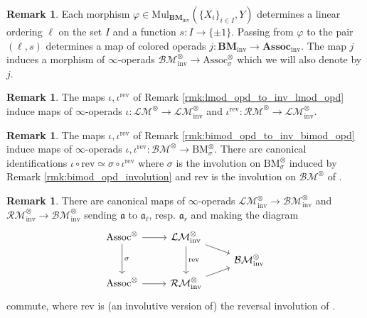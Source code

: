 \documentclass{article}
\renewcommand{\phi}{\varphi}
\newcommand{\Associnv}{\mathrm{Assoc}_\sigma}
\newcommand{\BMinv}{\mathrm{BM}_\sigma} %
\theoremstyle{definition}
\newtheorem{remark}[equation]{Remark}
\begin{document}
\begin{remark}\label{rmk:inv_bimod_opd_to_inv_alg_opd} %
    Each morphism $ \phi \in \mathrm{Mul}_{\mathbf{BM}_\mathrm{inv}} \left(\{X_i\}_{i \in I}, Y\right) $ determines a linear ordering $\ell $ on the set $ I $ and a function $ s \colon I \to \{\pm 1\} $. 
    Passing from $ \phi $ to the pair $ (\ell, s) $ determines a map of colored operads $ j \colon \mathbf{BM}_\mathrm{inv} \to \mathbf{Assoc}_\mathrm{inv} $. 
    The map $ j $ induces a morphism of $ \infty $-operads $  \mathcal{BM}_{\mathrm{inv}}^\otimes \to \Associnv^\otimes $ which we will also denote by $ j $. 
\end{remark} 
\begin{remark}\label{rmk:lmod_infty_opd_to_inv_lmod_infty_opd}
    The maps $ \iota, \iota^{\mathrm{rev}} $ of Remark \ref{rmk:lmod_opd_to_inv_lmod_opd} induce maps of $ \infty $-operads $ \iota \colon \mathcal{LM}^\otimes \to \mathcal{LM}^\otimes_{\mathrm{inv}} $ and $ \iota^{\mathrm{rev}} \colon \mathcal{RM}^\otimes \to \mathcal{LM}^\otimes_{\mathrm{inv}} $. 
\end{remark}
\begin{remark}\label{rmk:bimod_infty_opd_to_inv_bimod_infty_opd}
    The maps $ \iota, \iota^{\mathrm{rev}} $ of Remark \ref{rmk:bimod_opd_to_inv_bimod_opd} induce maps of $ \infty $-operads $ \iota, \iota^{\mathrm{rev}} \colon \mathcal{BM}^\otimes \to \BMinv^\otimes $. 
    There are canonical identifications $ \iota \circ \mathrm{rev} \simeq \sigma \circ \iota^{\mathrm{rev}} $ where $ \sigma $ is the involution on $ \BMinv^\otimes $ induced by Remark \ref{rmk:bimod_opd_involution} and $ \mathrm{rev} $ is the involution on $ \mathcal{BM}^\otimes $ of \cite[Construction 4.6.3.1]{LurHA}. 
\end{remark}
\begin{remark}\label{rmk:rmod_lmod_opd_to_inv_bimod_opd}
    There are canonical maps of $ \infty $-operads $ \mathcal{LM}^\otimes_{\mathrm{inv}} \to \mathcal{BM}^\otimes_{\mathrm{inv}} $ and $ \mathcal{RM}^\otimes_{\mathrm{inv}} \to \mathcal{BM}^\otimes_{\mathrm{inv}} $ sending $ \mathfrak{a} $ to $ \mathfrak{a}_\ell $, resp. $ \mathfrak{a}_r $ and making the diagram 
    \begin{equation*}
    \begin{tikzcd}[row sep=tiny]
        \mathrm{Assoc}^\otimes \ar[dd,"\sigma"] \ar[r] & \mathcal{LM}^\otimes_{\mathrm{inv}} \ar[dd,"{\mathrm{rev}}"] \ar[rd] & \\
        & & \mathcal{BM}^\otimes_{\mathrm{inv}}  \\ 
        \mathrm{Assoc}^\otimes  \ar[r] & \mathcal{RM}^\otimes_{\mathrm{inv}} \ar[ru] & 
    \end{tikzcd}   
    \end{equation*}
    commute, where $ \mathrm{rev} $ is (an involutive version of) the reversal involution of \cite[Remark 4.6.3.2]{LurHA}. 
\end{remark}
\end{document}
